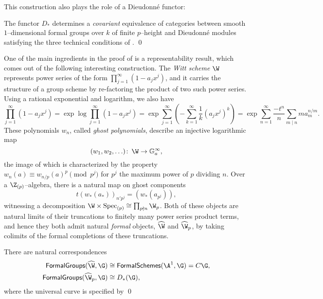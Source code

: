 This construction also plays the role of a Dieudonn\'e functor:

\begin{theorem}{\cite[Theorem 3.5 and Theorem 3.28]{ZinkCartierTheory}}\label{CurveDieudonneTheorem}
The functor $D_*$ determines a \emph{covariant} equivalence of categories between smooth $1$--dimensional formal groups over $k$ of finite $p$--height and Dieudonn\'e modules satisfying the three technical conditions of . \qed
\end{theorem}

One of the main ingredients in the proof of  is a representability result, which comes out of the following interesting construction.  The \textit{Witt scheme} $\W$ represents power series of the form $\prod_{j=1}^\infty (1 - a_j x^j)$, and it carries the structure of a group scheme by re-factoring the product of two such power series.  Using a rational exponential and logarithm, we also have \[\prod_{j=1}^\infty (1 - a_j x^j) = \exp \log \prod_{j=1}^\infty (1 - a_j x^j) = \exp \sum_{j=1}^\infty \left(-\sum_{k=1}^\infty \frac{1}{k} (a_j x^j)^k\right) = \exp \sum_{n=1}^\infty \frac{-t^n}{n} \sum_{m \mid n} m a_m^{n/m}.\]  These polynomials $w_n$, called \textit{ghost polynomials}, describe an injective logarithmic map \[(w_1, w_2, \ldots) \co \W \to \Ga^\infty,\] the image of which is characterized by the property $w_n(a) \equiv w_{n/p}(a)^p \pmod{p^j}$ for $p^j$ the maximum power of $p$ dividing $n$.  Over a $\Z_{(p)}$--algebra, there is a natural map on ghost components \[t(w_*(a_*))_{n'p^j} = (w_*(a_{p^j})),\] witnessing a decomposition $\W \times \Spec_{(p)} \cong \prod_{p \nmid n} \W_p$.  Both of these objects are natural limits of their truncations to finitely many power series product terms, and hence they both admit natural \emph{formal} objects, $\widehat{\W}$ and $\widehat{\W}_p$, by taking colimits of the formal completions of these truncations.

\begin{lemma}
There are natural correspondences
\begin{align*}
\CatOf{FormalGroups}(\widehat{\W}, \G) & \cong \CatOf{FormalSchemes}(\A^1, \G) = C\G, \\
\CatOf{FormalGroups}(\widehat{\W}_p, \G) & \cong D_*(\G),
\end{align*}
where the universal curve is specified by  \qed
\end{lemma}

